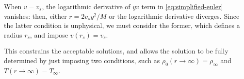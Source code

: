 \documentclass[main.tex]{subfiles}
\begin{document}
When \(v = v_s\), the logarithmic derivative of \(yv\) term in \eqref{eq:simplified-euler} vanishes: then, either \(r = 2 v_s y^2 /M\) or the logarithmic derivative diverges. Since the latter condition is unphysical, we must consider the former, which defines a radius \(r_s\), and impose \(v(r_s)=v_s\).

This constrains the acceptable solutions, and allows the solution to be fully determined by just imposing two conditions, such as \(\rho_0 (r \rightarrow \infty) = \rho_\infty\) and \(T (r \rightarrow \infty) = T_\infty\).
\end{document}
